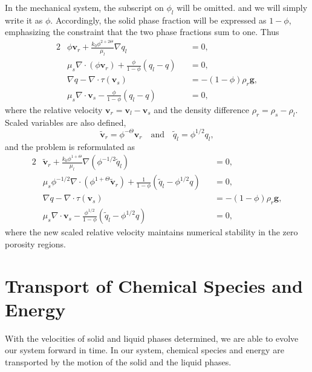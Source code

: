 In the mechanical system, the subscript on 
$\phi_l$ will be omitted.
and we will simply write it as $\phi$.
Accordingly, the solid phase fraction will be expressed as $1 - \phi$, 
emphasizing the constraint that the two phase fractions sum to one. Thus
\begin{alignat}{2}
		  &\phi\mathbf{v}_r + \frac{k_0\phi^{2+2\Theta}}{\mu_l}\nabla q_l &&= 0,\\
		  &\mu_s\nabla \cdot (\phi\mathbf{v}_r) + \frac{\phi}{1-\phi}(q_l-q) &&=0,\\
  		  &\nabla q - \nabla \cdot \tau(\mathbf{v}_s) &&= -(1-\phi)\rho_r\mathbf{g},\\
		  &\mu_s\nabla \cdot \mathbf{v}_s - \frac{\phi}{1-\phi}(q_l-q) &&=0,
\end{alignat}
where the relative velocity $\mathbf{v}_r = \mathbf{v}_l - \mathbf{v}_s$ and 
the density difference 
$\rho_r = \rho_s - \rho_l$. 
Scaled variables are also defined,
\begin{equation}\label{eq:scaledVariables}
		  \tilde{\mathbf{v}}_r = \phi^{-\Theta}\mathbf{v}_r
	\quad\text{and}\quad
	\tilde{q}_l = \phi^{1/2}q_l,
\end{equation}
and the problem is reformulated as
\begin{alignat}{2}
\label{eq:darcy_flow_sc}
		  &\tilde{\mathbf{v}}_r
		  + \frac{k_0\phi^{1+\Theta}}{\mu_l}\nabla(\phi^{-1/2}\tilde{q}_l)
        &&= 0,\\
\label{eq:consMass_flow_sc}
		  &\mu_s\phi^{-1/2}\nabla \cdot(\phi^{1+\Theta}\tilde{\mathbf{v}}_r)
        + \frac{1}{1-\phi}(\tilde{q}_l - \phi^{1/2}q) &&=0,\\
\label{eq:stokes_flow_sc}
		  &\nabla q - \nabla \cdot \tau(\mathbf{v}_s) &&= -(1-\phi)\rho_r \mathbf{g},\\
\label{eq:compaction_flow_sc}
		  &\mu_s\nabla \cdot \mathbf{v}_s
        - \frac{\phi^{1/2}}{1-\phi}(\tilde{q}_l - \phi^{1/2}q) &&=0,
\end{alignat}
where the new scaled relative velocity maintains numerical stability in the zero porosity regions.

\section{Transport of Chemical Species and Energy}
\label{sec:transport}
With the velocities of solid and liquid phases determined, 
we are able to
evolve our system forward in time.
In our system, chemical species and energy are transported by the
motion of the solid and the liquid phases.

